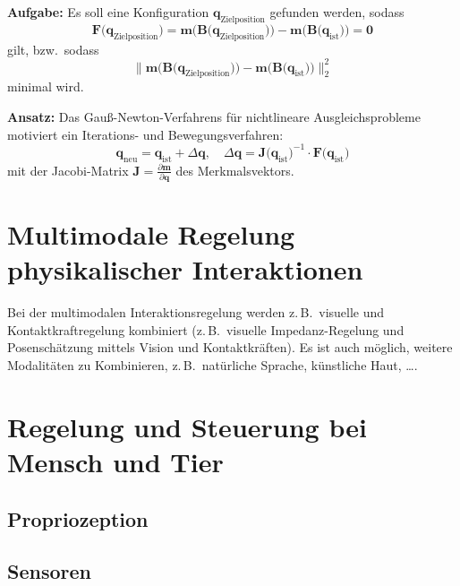 \documentclass[a4paper, 11pt, accentcolor = tud3b]{tudreport}
\newcommand{\mat}[1]{\boldsymbol{#1}}
\renewcommand{\vec}[1]{\boldsymbol{\mathbf{#1}}}
\newcommand{\bzw}{bzw.~}
\newcommand{\zB}{z.\,B.~}
\begin{document}
				\textbf{Aufgabe:}
				Es soll eine Konfiguration \( \vec{q}_\text{Zielposition} \) gefunden werden, sodass
				\begin{equation*}
					\vec{F}\big(\vec{q}_\text{Zielposition}\big) = \vec{m}\Big(\!\mat{B}\big(\vec{q}_\text{Zielposition}\big)\Big) - \vec{m}\Big(\!\mat{B}\big(\vec{q}_\text{ist}\big)\Big) = \vec{0}
				\end{equation*}
				gilt, \bzw sodass
				\begin{equation*}
					\Big\lVert \vec{m}\Big(\!\mat{B}\big(\vec{q}_\text{Zielposition}\big)\Big) - \vec{m}\Big(\!\mat{B}\big(\vec{q}_\text{ist}\big)\Big) \Big\rVert_2^2
				\end{equation*}
				minimal wird.
				
				\textbf{Ansatz:}
				Das Gauß-Newton-Verfahrens für nichtlineare Ausgleichsprobleme motiviert ein Iterations- und Bewegungsverfahren:
				\begin{equation*}
					\vec{q}_\text{neu} = \vec{q}_\text{ist} + \Delta\vec{q},\quad \Delta\vec{q} = \mat{J}\big(\vec{q}_\text{ist}\big)^{-1} \cdot \vec{F}\big(\vec{q}_\text{ist}\big)
				\end{equation*}
				mit der Jacobi-Matrix \( \mat{J} = \frac{\partial \vec{m}}{\partial \vec{q}} \) des Merkmalsvektors.

		\section{Multimodale Regelung physikalischer Interaktionen}
			Bei der multimodalen Interaktionsregelung werden \zB visuelle und Kontaktkraftregelung kombiniert (\zB visuelle Impedanz-Regelung und Posenschätzung mittels Vision und Kontaktkräften). Es ist auch möglich, weitere Modalitäten zu Kombinieren, \zB natürliche Sprache, künstliche Haut, \dots.

		\section{Regelung und Steuerung bei Mensch und Tier} %

			\subsection{Propriozeption} %

			\subsection{Sensoren} %
\end{document}
